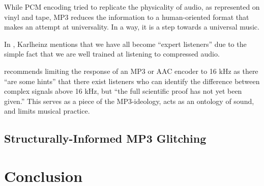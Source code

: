\documentclass{thesis}
\begin{document}
While PCM encoding tried to replicate the physicality of audio, as represented on vinyl and tape, MP3 reduces the information to a human-oriented format that makes an attempt at universality. In a way, it is a step towards a universal music.

In \cite[9]{karlheinz_brandenburg_mp3_1999}, Karlheinz mentions that we have all become ``expert listeners'' due to the simple fact that we are well trained at listening to compressed audio.

\cite[10]{karlheinz_brandenburg_mp3_1999} recommends limiting the response of an MP3 or AAC encoder to 16 kHz as there ``are some hints'' that there exist listeners who can identify the difference between complex signals above 16 kHz, but ``the full scientific proof has not yet been given.'' This serves as a piece of the MP3-ideology, acts as an ontology of sound, and limits musical practice.
	
\section{Structurally-Informed MP3 Glitching}

\chapter{Conclusion}

\begin{singlespace}


\end{singlespace}
\end{document}
